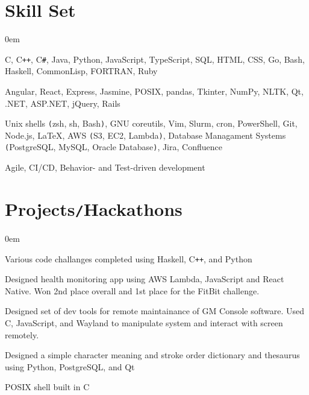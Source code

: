 \documentclass[11pt]{article}
\begin{document}
\vspace*{-15pt}
\section*{Skill Set}
\vspace*{-10pt}\hspace*{10pt}\begin{minipage}{0.935\textwidth}
    \begin{description}
        \itemsep0em
        \raggedright
        \item[Languages] C, C\texttt{++}, C\texttt{\#}, Java, Python, JavaScript, TypeScript, SQL, HTML, CSS, Go, Bash, Haskell,
            CommonLisp, FORTRAN, Ruby 
        \item[Frameworks\texttt{/}Libraries] Angular, React, Express, Jasmine, POSIX, pandas, Tkinter, NumPy, NLTK,
            Qt, .NET, ASP.NET, jQuery, Rails
        \item[Tools] Unix shells \texttt{(}zsh, sh, Bash\texttt{)}, GNU coreutils, Vim, Slurm, cron, PowerShell, Git, Node.js,
            \LaTeX, AWS \texttt{(}S3, EC2, Lambda\texttt{)}, Database Managament Systems \texttt{(}PostgreSQL, MySQL, Oracle
            Database\texttt{)}, Jira, Confluence
        \item[Methodologies] Agile, CI/CD, Behavior- and Test-driven development
    \end{description}
\end{minipage}

\vspace*{-15pt}
\section*{Projects\texttt{/}Hackathons}
\vspace*{-10pt}\hspace*{10pt}\begin{minipage}{0.93\textwidth}
    \begin{description}
        \itemsep0em
        \raggedright
        \item[Advent of Code] Various code challanges completed using Haskell, C\texttt{++}, and Python
        \item[DHack] Designed health monitoring app using AWS Lambda, JavaScript and React Native. Won 2nd place overall and 1st
            place for the FitBit challenge.
        \item[MHacks 8] Designed set of dev tools for remote maintainance of GM Console software. Used C, JavaScript, and
            Wayland to manipulate system and interact with screen remotely.
        \item[Chinese Character Dictionary] Designed a simple character meaning and stroke order dictionary and thesaurus using
            Python, PostgreSQL, and Qt
        \item[Mock Terminal] POSIX shell built in C
    \end{description}
\end{minipage}
\end{document}
